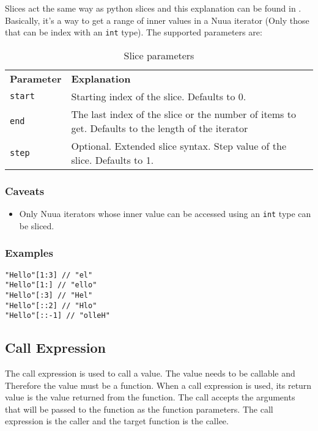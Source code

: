 Slices act the same way as python slices and this explanation can be found in \autocite{python_right_way}. Basically, it's a way to
get a range of inner values in a Nuua iterator (Only those that can be index with an \texttt{int} type).
The supported parameters are:

\begin{table}[H]
    \centering
    \begin{tabular}{ l p{7.5cm} }
        \textbf{Parameter} & \textbf{Explanation} \\
        \texttt{start} & Starting index of the slice. Defaults to 0.\\
        \texttt{end} & The last index of the slice or the number of items to get. Defaults to the length of the iterator\\
        \texttt{step} & Optional. Extended slice syntax. Step value of the slice. Defaults to 1.\\
    \end{tabular}
    \caption{Slice parameters}
    \label{fig:slice_parameters}
\end{table}

\subsubsection{Caveats}

\begin{itemize}
    \item Only Nuua iterators whose inner value can be accessed using an \texttt{int} type can be sliced.
\end{itemize}

\subsubsection{Examples}

\begin{lstlisting}
"Hello"[1:3] // "el"
"Hello"[1:] // "ello"
"Hello"[:3] // "Hel"
"Hello"[::2] // "Hlo"
"Hello"[::-1] // "olleH"
\end{lstlisting}

\subsection{Call Expression}

The call expression is used to call a value. The value needs to be callable and Therefore the value must be a function.
When a call expression is used, its return value is the value returned from the function. The call accepts the arguments
that will be passed to the function as the function parameters.
The call expression is the caller and the target function is the callee.

